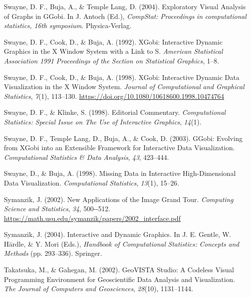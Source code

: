\documentclass[
  letterpaper,
]{krantz}
\newlength{\cslhangindent}
\newenvironment{CSLReferences}[2] %
 {\begin{list}{}{%
  \setlength{\itemindent}{0pt}
  \setlength{\leftmargin}{0pt}
  \setlength{\parsep}{0pt}
  \ifodd #1
   \setlength{\leftmargin}{\cslhangindent}
   \setlength{\itemindent}{-1\cslhangindent}
  \fi
  \setlength{\itemsep}{#2\baselineskip}}}
 {\end{list}}
\begin{document}
\begin{CSLReferences}{1}{0}
Swayne, D. F., Buja, A., \& Temple Lang, D. (2004). Exploratory {V}isual
{A}nalysis of {G}raphs in {GG}obi. In J. Antoch (Ed.), \emph{CompStat:
Proceedings in computational statistics, 16th symposium}.
Physica-Verlag.

Swayne, D. F., Cook, D., \& Buja, A. (1992). {XG}obi: {I}nteractive
{D}ynamic {G}raphics in the {X} {W}indow {S}ystem with a {L}ink to {S}.
\emph{American Statistical Association 1991 Proceedings of the Section
on Statistical Graphics}, 1--8.

Swayne, D. F., Cook, D., \& Buja, A. (1998). XGobi: {I}nteractive
{D}ynamic {D}ata {V}isualization in the {X} {W}indow {S}ystem.
\emph{Journal of Computational and Graphical Statistics}, \emph{7}(1),
113--130. \url{https://doi.org/10.1080/10618600.1998.10474764}

Swayne, D. F., \& Klinke, S. (1998). Editorial {C}ommentary.
\emph{Computational Statistics: Special Issue on The Use of Interactive
Graphics}, \emph{14}(1).

Swayne, D. F., Temple Lang, D., Buja, A., \& Cook, D. (2003). {GG}obi:
{E}volving from {XG}obi into an {E}xtensible {F}ramework for
{I}nteractive {D}ata {V}isualization. \emph{Computational Statistics \&
Data Analysis}, \emph{43}, 423--444.

Swayne, D., \& Buja, A. (1998). {M}issing {D}ata in {I}nteractive
{H}igh-{D}imensional {D}ata {V}isualization. \emph{Computational
Statistics}, \emph{13}(1), 15--26.

Symanzik, J. (2002). New {A}pplications of the {I}mage {G}rand {T}our.
\emph{Computing Science and Statistics}, \emph{34}, 500-\/-512.
\url{https://math.usu.edu/symanzik/papers/2002_interface.pdf}

Symanzik, J. (2004). Interactive and {D}ynamic {G}raphics. In J. E.
Gentle, W. Härdle, \& Y. Mori (Eds.), \emph{Handbook of {C}omputational
{S}tatistics: {C}oncepts and {M}ethods} (pp. 293--336). Springer.

Takatsuka, M., \& Gahegan, M. (2002). {GeoVISTA Studio}: A {C}odeless
{V}isual {P}rogramming {E}nvironment for {G}eoscientific {D}ata
{A}nalysis and {V}isualization. \emph{The Journal of Computers and
Geosciences}, \emph{28}(10), 1131--1144.


\end{CSLReferences}
\end{document}
